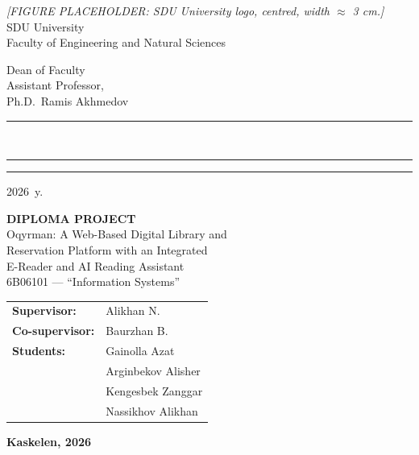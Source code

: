 \documentclass[12pt,a4paper]{report}
\begin{document}
\begin{titlepage}
    \begin{center}
        \vspace*{10mm}
        \textit{[FIGURE PLACEHOLDER: SDU University logo, centred, width $\approx$ 3 cm.]}\\[8mm]
        {\large SDU University}\\[2mm]
        {\large Faculty of Engineering and Natural Sciences}\\[20mm]
    \end{center}

    \begin{flushright}
        Dean of Faculty\\
        Assistant Professor,\\
        Ph.D.\ Ramis Akhmedov\\[8mm]
        \rule{6cm}{0.4pt}\\
        \textguillemotleft\rule{0.6cm}{0.4pt}\textguillemotright
        \rule{4cm}{0.4pt} 2026~y.
    \end{flushright}

    \vspace{20mm}
    \begin{center}
        {\Huge \textbf{DIPLOMA PROJECT}}\\[12mm]
        {\Large Oqyrman: A Web-Based Digital Library and\\
        Reservation Platform with an Integrated\\
        E-Reader and AI Reading Assistant}\\[10mm]
        {\large 6B06101 --- ``Information Systems''}
    \end{center}

    \vspace{15mm}
    \begin{center}
    \begin{tabular}{ll}
        \textbf{Supervisor:}     & Alikhan N.\\
        \textbf{Co-supervisor:}  & Baurzhan B.\\
        \textbf{Students:}       & Gainolla Azat\\
                                 & Arginbekov Alisher\\
                                 & Kengesbek Zanggar\\
                                 & Nassikhov Alikhan\\
    \end{tabular}
    \end{center}

    \vfill
    \begin{center}\textbf{Kaskelen, 2026}\end{center}
\end{titlepage}
\end{document}
